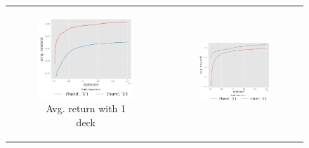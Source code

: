 \begin{figure}[htp]
\begin{tabular}{cc}
\centering
 \begin{subfigure}[b]{0.48\textwidth}
  	 \includegraphics[width=\textwidth]{./figures/avgReturnEp_ndeck1.png}
   \caption{Avg. return with 1 deck\label{sfig:nd1}}
 \end{subfigure}
 &
 \begin{subfigure}[b]{0.48\textwidth}
  	 \includegraphics[width=\textwidth]{./figures/avgReturnEp_ndeck2.png}

\end{subfigure}
\end{tabular}
\end{figure}
